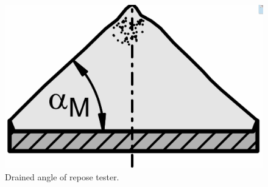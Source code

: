 \begin{figure}[!htb]
\centering
\includegraphics[width=.80\columnwidth]{images/005aor}
\caption[AoR tester]{Drained angle of repose tester.}
\label{fig:005aor}
\end{figure}